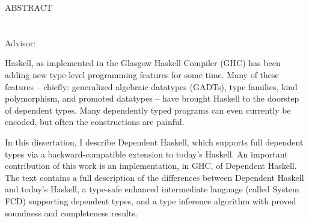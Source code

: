 \begin{doublespace}

\begin{centering}
{\Large ABSTRACT} \\
\Title \\
\Author \\
Advisor: \Advisor \\
\end{centering}

\vspace*{1in}

Haskell, as implemented in the Glasgow Haskell Compiler (GHC) has been adding
new type-level programming features for some time. Many of these features --
chiefly: generalized algebraic datatypes (GADTs), type families, kind
polymorphism, and promoted datatypes -- have brought Haskell to the doorstep
of dependent types. Many dependently typed programs can even currently be
encoded, but often the constructions are painful.

In this dissertation, I describe Dependent Haskell, which supports full
dependent types via a backward-compatible extension to today's Haskell. An
important contribution of this work is an implementation, in GHC, of Dependent
Haskell. The text contains a full description of the differences between
Dependent Haskell and today's Haskell, a type-safe enhanced intermediate
language (called System FCD) supporting dependent types, and a type inference
algorithm with proved soundness and completeness results.

\end{doublespace}
